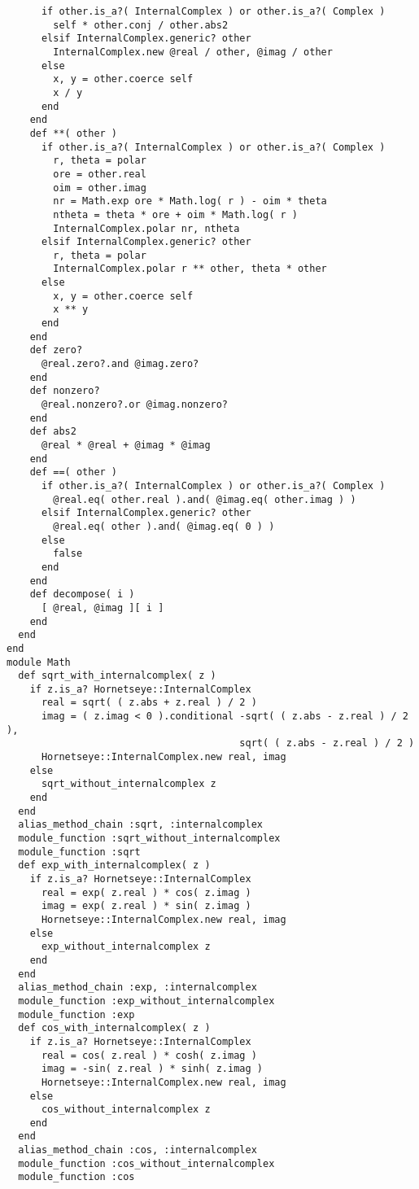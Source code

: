 \begin{lstlisting}
      if other.is_a?( InternalComplex ) or other.is_a?( Complex )
        self * other.conj / other.abs2
      elsif InternalComplex.generic? other
        InternalComplex.new @real / other, @imag / other
      else
        x, y = other.coerce self
        x / y
      end
    end
    def **( other )
      if other.is_a?( InternalComplex ) or other.is_a?( Complex )
        r, theta = polar
        ore = other.real
        oim = other.imag
        nr = Math.exp ore * Math.log( r ) - oim * theta
        ntheta = theta * ore + oim * Math.log( r )
        InternalComplex.polar nr, ntheta
      elsif InternalComplex.generic? other
        r, theta = polar
        InternalComplex.polar r ** other, theta * other
      else
        x, y = other.coerce self
        x ** y
      end
    end
    def zero?
      @real.zero?.and @imag.zero?
    end
    def nonzero?
      @real.nonzero?.or @imag.nonzero?
    end
    def abs2
      @real * @real + @imag * @imag
    end
    def ==( other )
      if other.is_a?( InternalComplex ) or other.is_a?( Complex )
        @real.eq( other.real ).and( @imag.eq( other.imag ) )
      elsif InternalComplex.generic? other
        @real.eq( other ).and( @imag.eq( 0 ) )
      else
        false
      end
    end
    def decompose( i )
      [ @real, @imag ][ i ]
    end
  end
end
module Math
  def sqrt_with_internalcomplex( z )
    if z.is_a? Hornetseye::InternalComplex
      real = sqrt( ( z.abs + z.real ) / 2 )
      imag = ( z.imag < 0 ).conditional -sqrt( ( z.abs - z.real ) / 2 ),
                                        sqrt( ( z.abs - z.real ) / 2 )
      Hornetseye::InternalComplex.new real, imag
    else
      sqrt_without_internalcomplex z
    end
  end
  alias_method_chain :sqrt, :internalcomplex
  module_function :sqrt_without_internalcomplex
  module_function :sqrt
  def exp_with_internalcomplex( z )
    if z.is_a? Hornetseye::InternalComplex
      real = exp( z.real ) * cos( z.imag )
      imag = exp( z.real ) * sin( z.imag )
      Hornetseye::InternalComplex.new real, imag
    else
      exp_without_internalcomplex z
    end
  end
  alias_method_chain :exp, :internalcomplex
  module_function :exp_without_internalcomplex
  module_function :exp
  def cos_with_internalcomplex( z )
    if z.is_a? Hornetseye::InternalComplex
      real = cos( z.real ) * cosh( z.imag )
      imag = -sin( z.real ) * sinh( z.imag )
      Hornetseye::InternalComplex.new real, imag
    else
      cos_without_internalcomplex z
    end
  end
  alias_method_chain :cos, :internalcomplex
  module_function :cos_without_internalcomplex
  module_function :cos

\end{lstlisting}
